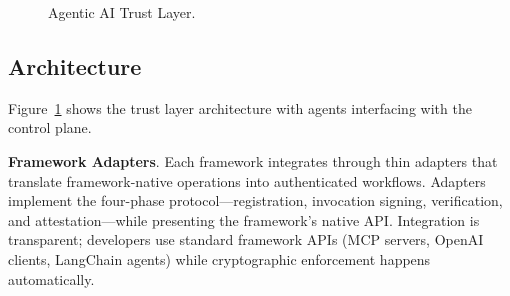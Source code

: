 \begin{figure}[t]
\caption{Agentic AI Trust Layer.}
\label{fig:runtime-architecture}
\end{figure}

\subsection{Architecture}

Figure~\ref{fig:runtime-architecture} shows the trust layer architecture with agents interfacing with the control plane.

\textbf{Framework Adapters}. Each framework integrates through thin adapters that translate framework-native operations into authenticated workflows. Adapters implement the four-phase protocol—registration, invocation signing, verification, and attestation—while presenting the framework's native API. Integration is transparent; developers use standard framework APIs (MCP servers, OpenAI clients, LangChain agents) while cryptographic enforcement happens automatically.

